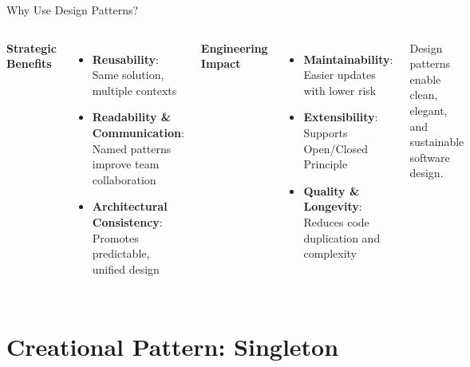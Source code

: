 \documentclass[aspectratio=169, table]{beamer}
\begin{document}
\begin{frame}[fragile]{Why Use Design Patterns?}
\vspace{10pt}
\begin{columns}[T]
\textbf{Strategic Benefits}
\begin{itemize}
\item \textbf{Reusability}:
Same solution, multiple contexts
\item \textbf{Readability \& Communication}:
Named patterns improve team collaboration
\item \textbf{Architectural Consistency}:
Promotes predictable, unified design
\end{itemize}

\textbf{Engineering Impact}
\begin{itemize}
\item \textbf{Maintainability}: Easier updates with lower risk
\item \textbf{Extensibility}: Supports Open/Closed Principle
\item \textbf{Quality \& Longevity}: Reduces code duplication and complexity
\end{itemize}

\vspace{5pt}
Design patterns enable clean, elegant, and sustainable software design.
\end{columns}
\end{frame}

\section{Creational Pattern: Singleton}
\end{document}
